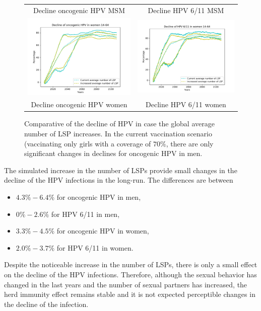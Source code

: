 \begin{figure}[!]
\begin{tabular}{cc}
		Decline oncogenic HPV MSM	& Decline HPV 6/11 MSM \\ 
		\includegraphics[width=0.5\linewidth]{IMGs/12.-Aumento_LSP/onco_muj.pdf}	& 
		\includegraphics[width=0.5\linewidth]{IMGs/12.-Aumento_LSP/verr_muj.pdf}  \\ 
		Decline oncogenic HPV women	& Decline HPV 6/11 women \\ 
	\end{tabular} 
	\caption{Comparative of the decline of HPV in case the global average number of LSP increases. In the current vaccination scenario (vaccinating only girls with a coverage of $70\%$, there are only significant changes in declines for oncogenic HPV in men.}
	\label{fig:compara_k}
\end{figure}

The simulated increase in the number of LSPs provide small changes in the decline of the HPV infections in the long-run. The differences are between

\begin{itemize}
	\item $4.3\% - 6.4\%$ for oncogenic HPV in men,
	\item $0\% - 2.6\%$ for HPV 6/11 in men,
	\item $3.3\% - 4.5\%$ for oncogenic HPV in women,
	\item $2.0\% - 3.7\%$ for HPV 6/11 in women.	
\end{itemize}

Despite the noticeable increase in the number of LSPs, there is only a small effect on the decline of the HPV infections. Therefore, although the sexual behavior has changed in the last years and the number of sexual partners has increased, the herd immunity effect remains stable and it is not expected perceptible changes in the decline of the infection.

